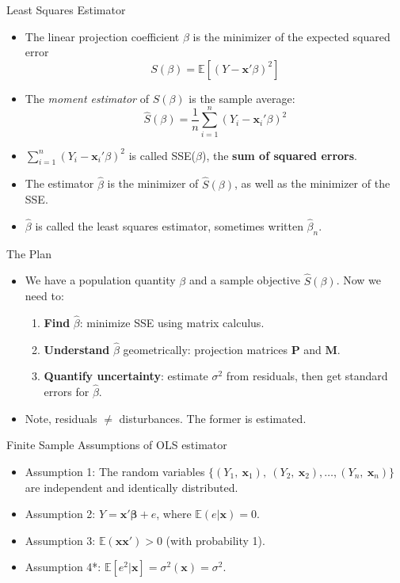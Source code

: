 \documentclass[aspectratio=169, handout]{beamer}
\numberwithin{equation}{section}
\begin{document}
\begin{frame}{Least Squares Estimator}
\begin{itemize}
\item The linear projection coefficient $\beta$ is the minimizer of the expected squared error 
$$S(\beta)=\mathbb{E}[(Y-\bm{x}'\beta)^2]$$
\item The \emph{moment estimator} of $S(\beta)$ is the sample average:
$$\hat{S}(\beta)=\frac{1}{n}\sum_{i=1}^{n}(Y_i-\bm{x}_i'\beta)^2$$
\item $\sum_{i=1}^{n}(Y_i-\bm{x}_i'\beta)^2$ is called SSE($\beta$), the \textbf{sum of squared errors}.
\item The estimator $\hat{\beta}$ is the minimizer of $\hat{S}(\beta)$, as well as the minimizer of the SSE.
\item $\hat{\beta}$ is called the least squares estimator, sometimes written $\hat{\beta}_n$.
\end{itemize}
\end{frame}



\begin{frame}{The Plan}
\begin{itemize}
\item We have a population quantity $\beta$ and a sample objective $\hat{S}(\beta)$. Now we need to:
\begin{enumerate}
\item \textbf{Find} $\hat{\beta}$: minimize SSE using matrix calculus.\pause
\item \textbf{Understand} $\hat{\beta}$ geometrically: projection matrices $\bm{P}$ and $\bm{M}$.\pause
\item \textbf{Quantify uncertainty}: estimate $\sigma^2$ from residuals, then get standard errors for $\hat{\beta}$.
\end{enumerate}\pause
\item Note, residuals $\neq$ disturbances.  The former is estimated.
\end{itemize}
\end{frame}

\begin{frame}{Finite Sample Assumptions of OLS estimator}
\begin{itemize}
\item Assumption 1: The random variables $\{(Y_1,\ \bm{x}_1),\ (Y_2,\ \bm{x}_2), \ldots, (Y_n,\ \bm{x}_n)\}$ are independent and identically distributed.
\item Assumption 2: $Y=\bm{x}'\bm{\beta}+e$, where $\mathbb{E}(e|\bm{x})=0$.
\item Assumption 3: $\mathbb{E}(\bm{x}\bm{x}')>0$ (with probability 1).
\item Assumption 4*: $\mathbb{E}[e^2|\bm{x}]=\sigma^2(\bm{x})=\sigma^2$. 
\end{itemize}
\end{frame}
\end{document}
